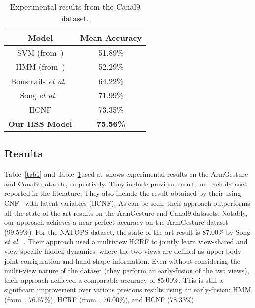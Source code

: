 \documentclass[10pt,twocolumn,letterpaper]{article}
\begin{document}
\begin{table}
\begin{center}
\begin{tabular}{|c|c|}
  \hline
  Model & Mean Accuracy \\
  \hline
  SVM (from~\cite{Modeling}) & 51.89\% \\
  HMM (from~\cite{Modeling}) & 52.29\% \\
  Bousmails \emph{et al.}~\cite{Modeling} & 64.22\% \\
  Song \emph{et al.}~\cite{Multimodal} & 71.99\% \\
  HCNF & 73.35\% \\
  \hline
  {\bf Our HSS Model} & {\bf 75.56\%} \\
  \hline
\end{tabular}
\end{center}
\caption{Experimental results from the Canal9 dataset.}
\label{tab2}
\end{table}

\subsection{Results}

Table~\ref{tab1} and Table~\ref{tab2}used at~\cite{action}shows experimental results on the ArmGesture and Canal9 datasets, respectively. They include previous results on each dataset reported in the literature; They also include the result obtained by their using CNF~\cite{Conditional} with latent variables (HCNF). As can be seen, their approach outperforms all the state-of-the-art results on the ArmGesture and Canal9 datasets. Notably, our approach achieves a near-perfect accuracy on the ArmGesture dataset (99.59\%).
For the NATOPS dataset, the state-of-the-art result is 87.00\% by Song \emph{et al.}~\cite{Multi}. Their approach used a multiview HCRF to jointly learn view-shared and view-specific hidden dynamics, where the two views are defined as upper body joint configuration and hand shape information. Even without considering the multi-view nature of the dataset (they perform an early-fusion of the two views), their approach achieved a comparable accuracy of 85.00\%. This is still a significant improvement over various previous results using an early-fusion: HMM (from~\cite{Multi}, 76.67\%), HCRF (from~\cite{Multi}, 76.00\%), and HCNF (78.33\%).


{\small

}
\end{document}
